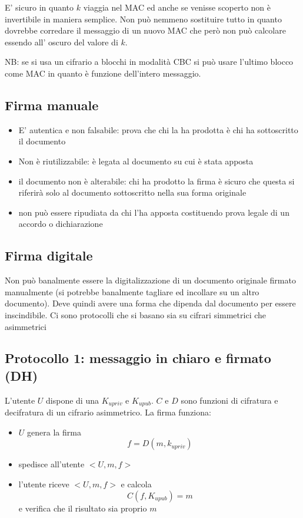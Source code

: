 E' sicuro in quanto $k$ viaggia nel MAC ed anche se venisse scoperto non è invertibile in maniera semplice.
Non può nemmeno sostituire tutto in quanto dovrebbe corredare il messaggio di un nuovo MAC che però non può calcolare essendo all' oscuro del valore di $k$.

NB: se si usa un cifrario a blocchi in modalità CBC si può usare l'ultimo blocco come MAC in quanto è funzione dell'intero messaggio.

\subsection{Firma manuale}
\begin{itemize}
    \item E' autentica e non falsabile: prova che chi la ha prodotta è chi ha sottoscritto il documento
    \item Non è riutilizzabile: è legata al documento su cui è stata apposta
    \item il documento non è alterabile: chi ha prodotto la firma è sicuro che questa si riferirà solo al documento sottoscritto nella sua forma originale
    \item non può essere ripudiata da chi l'ha apposta costituendo prova legale di un accordo o dichiarazione
\end{itemize}

\subsection{Firma digitale}
Non può banalmente essere la digitalizzazione di un documento originale firmato manualmente (si potrebbe banalmente tagliare ed incollare su un altro documento).
Deve quindi avere una forma che dipenda dal documento per essere inscindibile.
Ci sono protocolli che si basano sia su cifrari simmetrici che asimmetrici

\subsection{Protocollo 1: messaggio in chiaro e firmato (DH)}
L'utente $U$ dispone di una $K_{upriv}$ e $K_{upub}$. $C$ e $D$ sono funzioni di cifratura e decifratura di un cifrario asimmetrico.
La firma funziona:
\begin{itemize}
    \item $U$ genera la firma 
    $$f = D(m, k_{upriv})$$
    \item spedisce all'utente $<U,m,f>$
    \item l'utente riceve $<U,m,f>$ e calcola 
    $$C(f, K_{upub}) = m$$
    e verifica che il risultato sia proprio $m$
\end{itemize}

